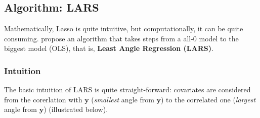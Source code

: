\documentclass[twoside]{article}
\begin{document}
\subsection{Algorithm: LARS}
Mathematically, Lasso is quite intuitive, but computationally, it can be quite consuming. \citet{efron2004least} propose an algorithm that takes steps from a all-0 model to the biggest model (OLS), that is, \textbf{Least Angle Regression (LARS)}. 

\subsubsection*{Intuition}
The basic intuition of LARS is quite straight-forward: covariates are considered from the  corerlation with $\mathbf{y}$ (\textit{smallest} angle from $\mathbf{y}$) to the  correlated one (\textit{largest} angle from $\mathbf{y}$) (illustrated below).
\end{document}
